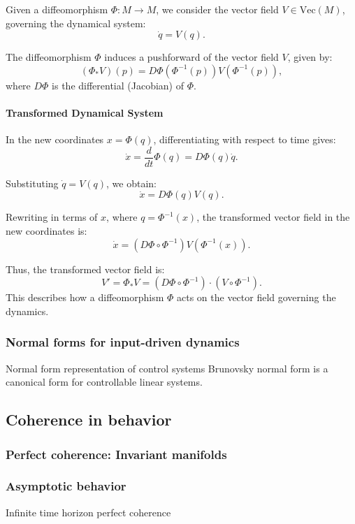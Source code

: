 \documentclass{article}
\theoremstyle{definition} \newtheorem{definition}{Definition}  \newtheorem{example}{Example}
\theoremstyle{remark} \newtheorem{remark}{Remark}
\newcounter{ct}
\begin{document}
Given a diffeomorphism \( \Phi: M \to M \), we consider the vector field \( V \in \text{Vec}(M) \), governing the dynamical system:
\[
\dot{q} = V(q).
\]

The diffeomorphism \( \Phi \) induces a pushforward of the vector field \( V \), given by:
\[
(\Phi_* V)(p) = D\Phi(\Phi^{-1}(p)) V(\Phi^{-1}(p)),
\]
where \( D\Phi \) is the differential (Jacobian) of \( \Phi \).  

\paragraph{Transformed Dynamical System}
In the new coordinates \( x = \Phi(q) \), differentiating with respect to time gives:
\[
\dot{x} = \frac{d}{dt} \Phi(q) = D\Phi(q) \dot{q}.
\]

Substituting \( \dot{q} = V(q) \), we obtain:
\[
\dot{x} = D\Phi(q) V(q).
\]

Rewriting in terms of \( x \), where \( q = \Phi^{-1}(x) \), the transformed vector field in the new coordinates is:
\[
\dot{x} = (D\Phi \circ \Phi^{-1}) V(\Phi^{-1}(x)).
\]

Thus, the transformed vector field is:
\[
V' = \Phi_* V = (D\Phi \circ \Phi^{-1}) \cdot (V \circ \Phi^{-1}).
\]
This describes how a diffeomorphism \( \Phi \) acts on the vector field governing the dynamics.




\subsubsection{Normal forms for input-driven dynamics}
Normal form representation of control systems  \citep{gilbert1963controllability}
Brunovsky normal form is a canonical form for controllable linear systems.



\subsection{Coherence in behavior}
\subsubsection{Perfect coherence: Invariant manifolds}%


\subsubsection{Asymptotic behavior}\label{sec:asymptotic}
Infinite time horizon perfect coherence
\end{document}

